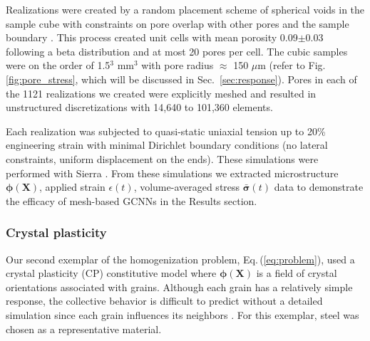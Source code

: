 \documentclass[12pt,reqno]{article}
\newcommand{\ADD}[1]{{#1}}
\newcommand{\fref}[1]{Fig.\,\ref{#1}}
\newcommand{\eref}[1]{Eq.\,(\ref{#1})}
\newcommand{\sref}[1]{Sec.\!~\ref{#1}}
\newcommand{\Xb}{\mathbf{X}}
\newcommand{\sigmab}{{\boldsymbol{\sigma}}}
\newcommand{\phib}{{\boldsymbol{\phi}}}
\begin{document}
\ADD{
Realizations were created by a random placement scheme of spherical voids in the sample cube  with constraints on pore overlap with other pores and the sample boundary \cite{brown2018multiscale}.
This process created unit cells with mean porosity 0.09$\pm$0.03 following a beta distribution and at most 20 pores per cell.
The cubic samples were on the order of 1.5$^3$ mm$^3$  with pore radius $\approx$ 150 $\mu$m (refer to \fref{fig:pore_stress}, which will be discussed in \sref{sec:response}).
Pores in each of the 1121 realizations we created  were explicitly meshed and resulted in unstructured discretizations with 14,640 to 101,360 elements.
}

\ADD{
Each realization was subjected to quasi-static uniaxial tension up to 20\% engineering strain with minimal Dirichlet boundary conditions (no lateral constraints, uniform displacement on the ends).
These simulations were performed with Sierra \cite{sierra}.
From these simulations we extracted microstructure $\phib(\Xb)$, applied strain $\epsilon(t)$, volume-averaged stress $\bar{\sigmab}(t)$  data to demonstrate the efficacy of mesh-based GCNNs in the Results section.
}

\subsubsection{Crystal plasticity}\label{sec:crystal_plasticity}

Our second exemplar of the homogenization problem, \eref{eq:problem}, used a crystal plasticity (CP) constitutive model  where $\phib(\Xb)$ is a field of crystal orientations associated with grains.
Although each grain has a relatively simple response, the collective behavior is difficult to predict without a detailed simulation since each grain influences its neighbors \cite{frankel2019oligocrystals}.
For this exemplar, steel was chosen as a representative material.
\end{document}
